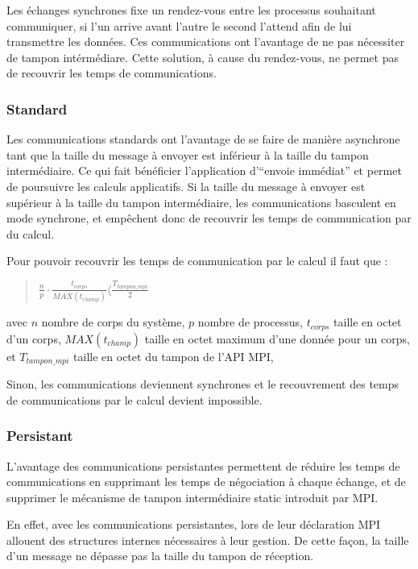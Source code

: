 \par Les échanges synchrones fixe un rendez-vous entre les processus souhaitant communiquer,
si l'un arrive avant l'autre le second l'attend afin de lui transmettre les données. 
Ces communications ont l'avantage de ne pas nécessiter de tampon intérmédiare.
Cette solution, à cause du rendez-vous, ne permet pas de recouvrir les temps de communications.\\

\subsubsection{Standard}

\par Les communications standards ont l'avantage de se faire de manière asynchrone tant que 
la taille du message à envoyer est inférieur à la taille du tampon intermédiaire. Ce qui 
fait bénéficier l'application d'``envoie immédiat'' et permet de poursuivre les calculs
applicatifs. Si la taille du message à envoyer est supérieur à la taille du tampon
intermédiaire, les communications basculent en mode synchrone, et empêchent donc de 
recouvrir les temps de communication par du calcul.\\

\par Pour pouvoir recouvrir les temps de communication par le calcul il faut que :
\begin{quote}
  \begin{center}
    $\frac{n}{p}\cdot \frac{t_{corps}}{MAX(t_{champ})} \langle \frac{T_{tampon\_mpi}}{2}$    
  \end{center}
\end{quote}
avec $n$ nombre de corps du système, $p$ nombre de processus, $t_{corps}$ taille en octet d'un corps,
$MAX(t_{champ})$ taille en octet maximum d'une donnée pour un corps,
et $T_{tampon\_mpi}$ taille en octet du tampon de l'API MPI,\\

\par Sinon, les communications deviennent synchrones et le recouvrement des temps de 
communications par le calcul devient impossible.\\

\subsubsection{Persistant}

\par L'avantage des communications persistantes permettent de réduire les temps de
communications en supprimant les temps de négociation à chaque échange, et de supprimer 
le mécanisme de tampon intermédiaire static introduit par MPI.\\
\par En effet, avec les communications persistantes, lors de leur déclaration MPI allouent
des structures internes nécessaires à leur gestion. De cette façon, la taille d'un message 
ne dépasse pas la taille du tampon de réception.\\

